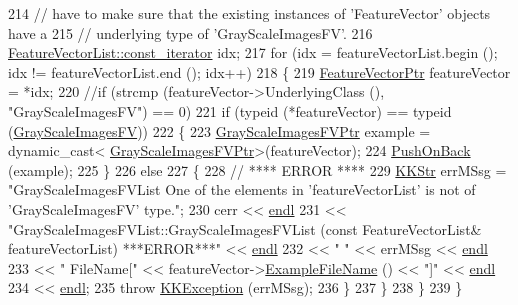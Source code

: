 \begin{DoxyCode}
214     \textcolor{comment}{// have to make sure that the existing instances of 'FeatureVector' objects have a }
215     \textcolor{comment}{// underlying type of 'GrayScaleImagesFV'.}
216     \hyperlink{class_k_k_b_1_1_k_k_queue_aeb057c9c010446f46f57c1e355f981f1}{FeatureVectorList::const\_iterator}  idx;
217     \textcolor{keywordflow}{for}  (idx = featureVectorList.begin ();  idx != featureVectorList.end ();  idx++)
218     \{
219       \hyperlink{class_k_k_m_l_l_1_1_feature_vector}{FeatureVectorPtr} featureVector = *idx;
220       \textcolor{comment}{//if  (strcmp (featureVector->UnderlyingClass (), "GrayScaleImagesFV") == 0)}
221       \textcolor{keywordflow}{if}  (\textcolor{keyword}{typeid} (*featureVector) == \textcolor{keyword}{typeid} (\hyperlink{class_k_k_m_l_l_1_1_gray_scale_images_f_v}{GrayScaleImagesFV}))
222       \{
223         \hyperlink{class_k_k_m_l_l_1_1_gray_scale_images_f_v}{GrayScaleImagesFVPtr} example = \textcolor{keyword}{dynamic\_cast<}
      \hyperlink{class_k_k_m_l_l_1_1_gray_scale_images_f_v}{GrayScaleImagesFVPtr}\textcolor{keyword}{>}(featureVector);
224         \hyperlink{class_k_k_m_l_l_1_1_feature_vector_list_abd43779a90a6aa3db1de8092be877bdb}{PushOnBack} (example);
225       \}
226       \textcolor{keywordflow}{else}
227       \{
228         \textcolor{comment}{// ****    ERROR  ****}
229         \hyperlink{class_k_k_b_1_1_k_k_str}{KKStr}  errMSsg = \textcolor{stringliteral}{"GrayScaleImagesFVList   One of the elements in 'featureVectorList' is not of
       'GrayScaleImagesFV'  type."};
230         cerr << \hyperlink{namespace_k_k_b_ad1f50f65af6adc8fa9e6f62d007818a8}{endl}
231              << \textcolor{stringliteral}{"GrayScaleImagesFVList::GrayScaleImagesFVList (const FeatureVectorList&  featureVectorList)
         ***ERROR***"} << \hyperlink{namespace_k_k_b_ad1f50f65af6adc8fa9e6f62d007818a8}{endl}
232              << \textcolor{stringliteral}{"        "} << errMSsg  << \hyperlink{namespace_k_k_b_ad1f50f65af6adc8fa9e6f62d007818a8}{endl}
233              << \textcolor{stringliteral}{"       FileName["} << featureVector->\hyperlink{class_k_k_m_l_l_1_1_feature_vector_ab47c89ab1e9396664fdc0dc34b6e1ab5}{ExampleFileName} () << \textcolor{stringliteral}{"]"}  << 
      \hyperlink{namespace_k_k_b_ad1f50f65af6adc8fa9e6f62d007818a8}{endl}
234              << \hyperlink{namespace_k_k_b_ad1f50f65af6adc8fa9e6f62d007818a8}{endl};
235         \textcolor{keywordflow}{throw} \hyperlink{class_k_k_b_1_1_k_k_exception}{KKException} (errMSsg);
236       \}
237     \}
238   \}
239 \}
\end{DoxyCode}
